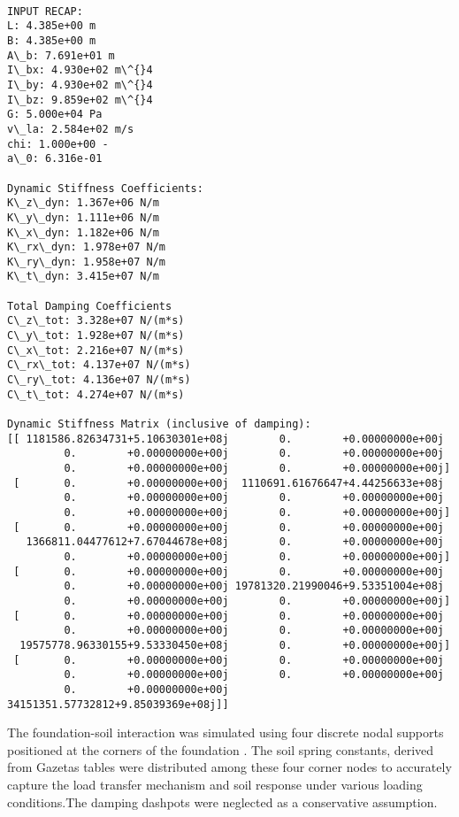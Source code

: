 \documentclass[11pt]{article}
\begin{document}
    \begin{Verbatim}[commandchars=\\\{\}]

INPUT RECAP:
L: 4.385e+00 m
B: 4.385e+00 m
A\_b: 7.691e+01 m
I\_bx: 4.930e+02 m\^{}4
I\_by: 4.930e+02 m\^{}4
I\_bz: 9.859e+02 m\^{}4
G: 5.000e+04 Pa
v\_la: 2.584e+02 m/s
chi: 1.000e+00 -
a\_0: 6.316e-01

Dynamic Stiffness Coefficients:
K\_z\_dyn: 1.367e+06 N/m
K\_y\_dyn: 1.111e+06 N/m
K\_x\_dyn: 1.182e+06 N/m
K\_rx\_dyn: 1.978e+07 N/m
K\_ry\_dyn: 1.958e+07 N/m
K\_t\_dyn: 3.415e+07 N/m

Total Damping Coefficients
C\_z\_tot: 3.328e+07 N/(m*s)
C\_y\_tot: 1.928e+07 N/(m*s)
C\_x\_tot: 2.216e+07 N/(m*s)
C\_rx\_tot: 4.137e+07 N/(m*s)
C\_ry\_tot: 4.136e+07 N/(m*s)
C\_t\_tot: 4.274e+07 N/(m*s)

Dynamic Stiffness Matrix (inclusive of damping):
[[ 1181586.82634731+5.10630301e+08j        0.        +0.00000000e+00j
         0.        +0.00000000e+00j        0.        +0.00000000e+00j
         0.        +0.00000000e+00j        0.        +0.00000000e+00j]
 [       0.        +0.00000000e+00j  1110691.61676647+4.44256633e+08j
         0.        +0.00000000e+00j        0.        +0.00000000e+00j
         0.        +0.00000000e+00j        0.        +0.00000000e+00j]
 [       0.        +0.00000000e+00j        0.        +0.00000000e+00j
   1366811.04477612+7.67044678e+08j        0.        +0.00000000e+00j
         0.        +0.00000000e+00j        0.        +0.00000000e+00j]
 [       0.        +0.00000000e+00j        0.        +0.00000000e+00j
         0.        +0.00000000e+00j 19781320.21990046+9.53351004e+08j
         0.        +0.00000000e+00j        0.        +0.00000000e+00j]
 [       0.        +0.00000000e+00j        0.        +0.00000000e+00j
         0.        +0.00000000e+00j        0.        +0.00000000e+00j
  19575778.96330155+9.53330450e+08j        0.        +0.00000000e+00j]
 [       0.        +0.00000000e+00j        0.        +0.00000000e+00j
         0.        +0.00000000e+00j        0.        +0.00000000e+00j
         0.        +0.00000000e+00j 34151351.57732812+9.85039369e+08j]]
    \end{Verbatim}

    The foundation-soil interaction was simulated using four discrete nodal
supports positioned at the corners of the foundation . The soil spring
constants, derived from Gazetas tables were distributed among these four
corner nodes to accurately capture the load transfer mechanism and soil
response under various loading conditions.The damping dashpots were
neglected as a conservative assumption.
\end{document}
